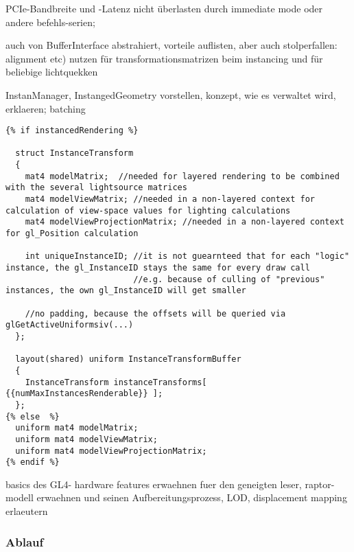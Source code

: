 	PCIe-Bandbreite und -Latenz nicht überlasten durch immediate mode oder andere befehls-serien;

	auch von BufferInterface abstrahiert, vorteile auflisten, aber auch stolperfallen: alignment etc)	
	nutzen für transformationsmatrizen beim instancing und für beliebige lichtquekken

	
	\label{sec:instancing}
	InstanManager, InstangedGeometry vorstellen, konzept, wie es verwaltet wird, erklaeren;
	batching
 	\lstset{language=GLSL}
 	\begin{lstlisting}[caption={Transformationsmatrizen-Uniforms im Vertex Shader},label=listing:VertShaderTransformDef]
{% if instancedRendering %}

  struct InstanceTransform
  {
    mat4 modelMatrix;  //needed for layered rendering to be combined with the several lightsource matrices
    mat4 modelViewMatrix; //needed in a non-layered context for calculation of view-space values for lighting calculations
    mat4 modelViewProjectionMatrix; //needed in a non-layered context for gl_Position calculation
    
    int uniqueInstanceID; //it is not guearnteed that for each "logic" instance, the gl_InstanceID stays the same for every draw call
                          //e.g. because of culling of "previous" instances, the own gl_InstanceID will get smaller 
    
    //no padding, because the offsets will be queried via glGetActiveUniformsiv(...)
  };

  layout(shared) uniform InstanceTransformBuffer
  {
    InstanceTransform instanceTransforms[  {{numMaxInstancesRenderable}} ];
  };
{% else  %}
  uniform mat4 modelMatrix;
  uniform mat4 modelViewMatrix;
  uniform mat4 modelViewProjectionMatrix; 
{% endif %}
 	\end{lstlisting}
 	\lstset{language=C++} %
	
	
	
	basics des GL4- hardware features erwaehnen fuer den geneigten leser, raptor-modell erwaehnen und seinen 		
	Aufbereitungsprozess, LOD, displacement mapping erlaeutern	
	
	
\subsubsection{Ablauf}	

